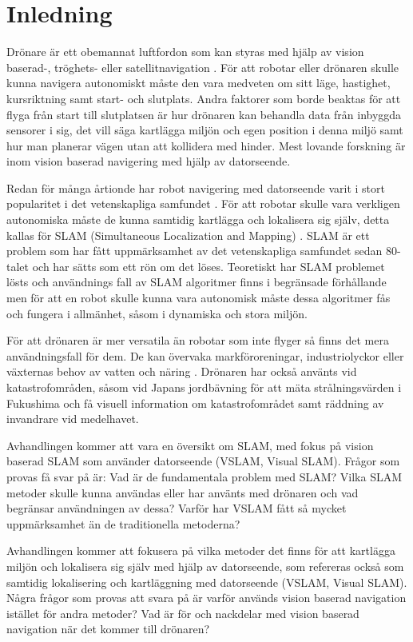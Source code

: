 \chapter{Inledning}

Drönare är ett obemannat luftfordon som kan styras med hjälp av vision baserad-, tröghets- eller satellitnavigation \citep{geospatial}. För att robotar eller drönaren skulle kunna navigera autonomiskt måste den vara medveten om sitt läge, hastighet, kursriktning samt start- och slutplats. Andra faktorer som borde beaktas för att flyga från start till slutplatsen är hur drönaren kan behandla data från inbyggda sensorer i sig, det vill säga kartlägga miljön och egen position i denna miljö samt hur man planerar vägen utan att kollidera med hinder. Mest lovande forskning är inom vision baserad navigering med hjälp av datorseende.

Redan för många årtionde har robot navigering med datorseende varit i stort popularitet i det vetenskapliga samfundet \citep{982903}. För att robotar skulle vara verkligen autonomiska måste de kunna samtidig kartlägga och lokalisera sig själv, detta kallas för SLAM (Simultaneous Localization and Mapping) \citep{realslamproblem}. SLAM är ett problem som har fått uppmärksamhet av det vetenskapliga samfundet sedan 80-talet och har sätts som ett rön om det löses. Teoretiskt har SLAM problemet lösts och användnings fall av SLAM algoritmer finns i begränsade förhållande men för att en robot skulle kunna vara autonomisk måste dessa algoritmer fås och fungera i allmänhet, såsom i dynamiska och stora miljön.

För att drönaren är mer versatila än robotar som inte flyger så finns det mera användningsfall för dem. De kan övervaka markföroreningar, industriolyckor eller växternas behov av vatten och näring \citep{crowdsurveillance}. Drönaren har också använts vid katastrofområden, såsom vid Japans jordbävning för att mäta strålningsvärden i Fukushima och få visuell information om katastrofområdet samt räddning av invandrare vid medelhavet.

Avhandlingen kommer att vara en översikt om SLAM, med fokus på vision baserad SLAM som använder datorseende (VSLAM, Visual SLAM). Frågor som provas få svar på är: Vad är de fundamentala problem med SLAM? Vilka SLAM metoder skulle kunna användas eller har använts med drönaren och vad begränsar användningen av dessa? Varför har VSLAM fått så mycket uppmärksamhet än de traditionella metoderna?

Avhandlingen kommer att fokusera på vilka metoder det finns för att kartlägga miljön och lokalisera sig själv med hjälp av datorseende, som refereras också som samtidig lokalisering och kartläggning med datorseende (VSLAM, Visual SLAM). Några frågor som provas att svara på är varför används vision baserad navigation istället för andra metoder? Vad är för och nackdelar med vision baserad navigation när det kommer till drönaren?

